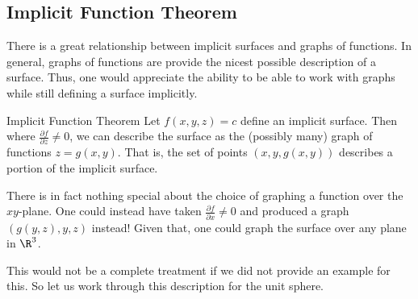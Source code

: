                  \subsection{Implicit Function Theorem}
                 
                 There is a great relationship between implicit surfaces and graphs of functions.  In general, graphs of functions are provide the nicest possible description of a surface.  Thus, one would appreciate the ability to be able to work with graphs while still defining a surface implicitly.  
                 
                 \begin{thm}{Implicit Function Theorem}
                 	Let $f(x,y,z)=c$ define an implicit surface.  Then where $\frac{\partial f}{\partial z}\neq 0$, we can describe the surface as the (possibly many) graph of functions $z=g(x,y)$. That is, the set of points $(x,y,g(x,y))$ describes a portion of the implicit surface.  
                 \end{thm}
                 
                 \begin{remark}
                 	There is in fact nothing special about the choice of graphing a function over the $xy$-plane.  One could instead have taken $\frac{\partial f}{\partial x} \neq 0$ and produced a graph $(g(y,z),y,z)$ instead! Given that, one could graph the surface over any plane in $\R^3$.
                 \end{remark}	
                 
                 This would not be a complete treatment if we did not provide an example for this.  So let us work through this description for the unit sphere.
                 
